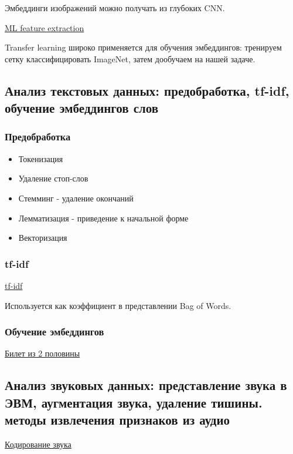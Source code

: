 \documentclass{article}
\begin{document}
Эмбеддинги изображений можно получать из глубоких CNN.

\href{
	https://en.wikipedia.org/wiki/Template_matching#Feature-based_approach
}{ML feature extraction}

Transfer learning широко применяется для обучения эмбеддингов:
тренируем сетку классифицировать ImageNet, затем дообучаем на нашей задаче.


\subsection{Анализ текстовых данных: предобработка, tf-idf, обучение эмбеддингов слов}

\subsubsection{Предобработка}

\begin{itemize}
	\item Токенизация
	\item Удаление стоп-слов
	\item Стемминг - удаление окончаний
	\item Лемматизация - приведение к начальной форме
	\item Векторизация
\end{itemize}

\subsubsection{tf-idf}

\href{
	https://ru.wikipedia.org/wiki/TF-IDF
}{tf-idf}

Используется как коэффициент в представлении Bag of Words.

\subsubsection{Обучение эмбеддингов}

\hyperref[sec:word_embeddings]{Билет из 2 половины}


\subsection{Анализ звуковых данных: представление звука в ЭВМ, аугментация звука,
удаление тишины. методы извлечения признаков из аудио}

\href{
	https://ru.wikipedia.org/wiki/%
}{Кодирование звука}
\end{document}

